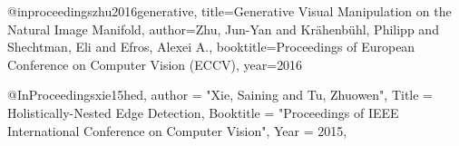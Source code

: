 @inproceedings{zhu2016generative,
  title={Generative Visual Manipulation on the Natural Image Manifold},
  author={Zhu, Jun-Yan and Kr{\"a}henb{\"u}hl, Philipp and Shechtman, Eli and Efros, Alexei A.},
  booktitle={Proceedings of European Conference on Computer Vision (ECCV)},
  year={2016}
}

@InProceedings{xie15hed,
  author = {"Xie, Saining and Tu, Zhuowen"},
  Title = {Holistically-Nested Edge Detection},
  Booktitle = "Proceedings of IEEE International Conference on Computer Vision",
  Year  = {2015},
}
